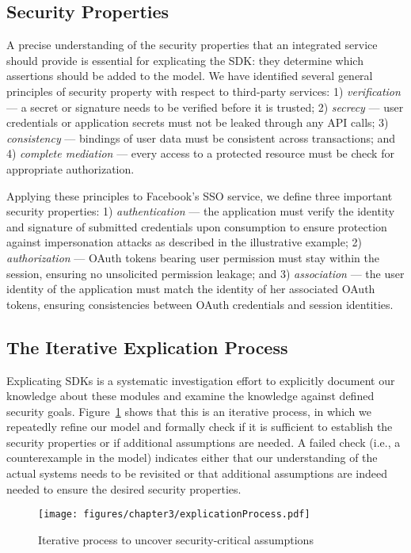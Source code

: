\subsection{Security Properties}
\label{sec:security_properties}
A precise understanding of the security properties that an integrated service should provide is essential for explicating the SDK: they determine which assertions should be added to the model.  We have identified several general principles of security property with respect to third-party services: 1) \emph{verification} --- a secret or signature needs to be verified before it is trusted; 2) \emph{secrecy} --- user credentials or application secrets must not be leaked through any API calls; 3) \emph{consistency} --- bindings of user data must be consistent across transactions; and 4) \emph{complete mediation} --- every access to a protected resource must be check for appropriate authorization.  

Applying these principles to Facebook's SSO service, we define three important security properties: 1) \emph{authentication}
--- the application must verify the identity and signature of submitted credentials upon consumption to ensure protection against impersonation attacks as described in the illustrative example; 2) \emph{authorization} --- OAuth tokens bearing user
permission must stay within the session, ensuring no unsolicited permission leakage; and 3) \emph{association} --- the user identity of the application must match the identity of her associated OAuth tokens, ensuring consistencies between OAuth credentials and session identities.

\subsection{The Iterative Explication Process}

Explicating SDKs is a systematic investigation effort to explicitly document our knowledge about these modules and examine the knowledge against defined security goals.  Figure~\ref{fig:iterativeprocess} shows that this is an iterative process, in which we repeatedly refine our model and formally check if it is sufficient to establish the security properties or if additional assumptions are needed.  A failed check (i.e., a counterexample in the model) indicates either that our understanding of the actual systems needs to be revisited or that additional assumptions are indeed needed to ensure the desired security properties.  

\begin{figure}[hbt]
\centering
\texttt{[image: figures/chapter3/explicationProcess.pdf]}
\caption{Iterative process to uncover security-critical assumptions}
\label{fig:iterativeprocess}
\end{figure}

